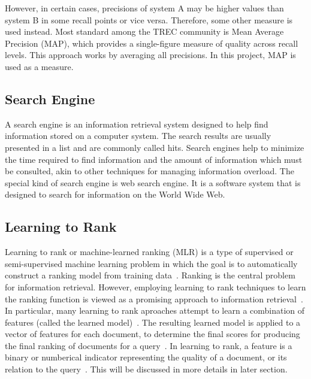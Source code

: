 However, in certain cases, precisions of system A may be higher values than system B in some recall points or vice versa. Therefore,
some other measure is used instead. Most standard among the TREC community is Mean Average Precision (MAP), which provides a single-figure 
measure of quality across recall levels. This approach works by averaging all precisions. In this project, MAP is used as a measure.

\subsection{Search Engine}
A search engine is an information retrieval system designed to help find information stored on a computer system. The search results are usually 
presented in a list and are commonly called hits. Search engines help to minimize the time required to find information and the amount of 
information which must be consulted, akin to other techniques for managing information overload. The special kind of search engine is 
web search engine. It is a software system that is designed to search for information on the World Wide Web.

\subsection{Learning to Rank}
Learning to rank or machine-learned ranking (MLR) is a type of supervised or semi-supervised machine learning problem in which the goal is 
to automatically construct a ranking model from training data~\cite{letor}. Ranking is the central problem for information retrieval. 
However, employing learning to rank techniques to learn the ranking function is viewed as
a promising approach to information retrieval~\cite{letor}. In particular, many learning to rank aproaches attempt to learn a combination of features
(called the learned model)~\cite[P. 3]{learningmodel}. The resulting learned model is applied to a vector of features for each document, to determine the final scores for 
producing the final ranking of documents for a query~\cite[P. 3]{learningmodel}. In learning to rank, a feature is a binary or numberical indicator 
representing the quality of a document, or its relation to the query~\cite[P. 4]{learningmodel}. This will be discussed in more details in later section.

